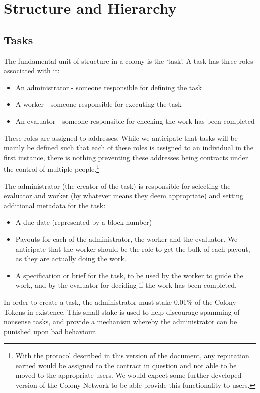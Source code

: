 \section{Structure and Hierarchy}

\subsection{Tasks}\label{sec:tasks}

The fundamental unit of structure in a colony is the `task'. A task has three roles associated with it:
\begin{itemize}
\item An administrator - someone responsible for defining the task
\item A worker - someone responsible for executing the task
\item An evaluator - someone responsible for checking the work has been completed
\end{itemize}

These roles are assigned to addresses. While we anticipate that tasks will be mainly be defined such that each of these roles is assigned to an individual in the first instance, there is nothing preventing these addresses being contracts under the control of multiple people.\footnote{With the protocol described in this version of the document, any reputation  earned would be assigned to the contract in question and not able to be moved to the appropriate users. We would expect some further developed version of the Colony Network to be able provide this functionality to users.}

The administrator (the creator of the task) is responsible for selecting the evaluator and worker (by whatever means they deem appropriate) and setting additional metadata for the task:

\begin{itemize}
\item A due date (represented by a block number)
\item Payouts for each of the administrator, the worker and the evaluator. We anticipate that the worker should be the role to get the bulk of each payout, as they are actually doing the work. 
\item A specification or brief for the task, to be used by the worker to guide the work, and by the evaluator for deciding if the work has been completed.
\end{itemize}

In order to create a task, the administrator must stake 0.01\% of the Colony Tokens in existence. This small stake is used to help discourage spamming of nonsense tasks, and provide a mechanism whereby the administrator can be punished upon bad behaviour. 

